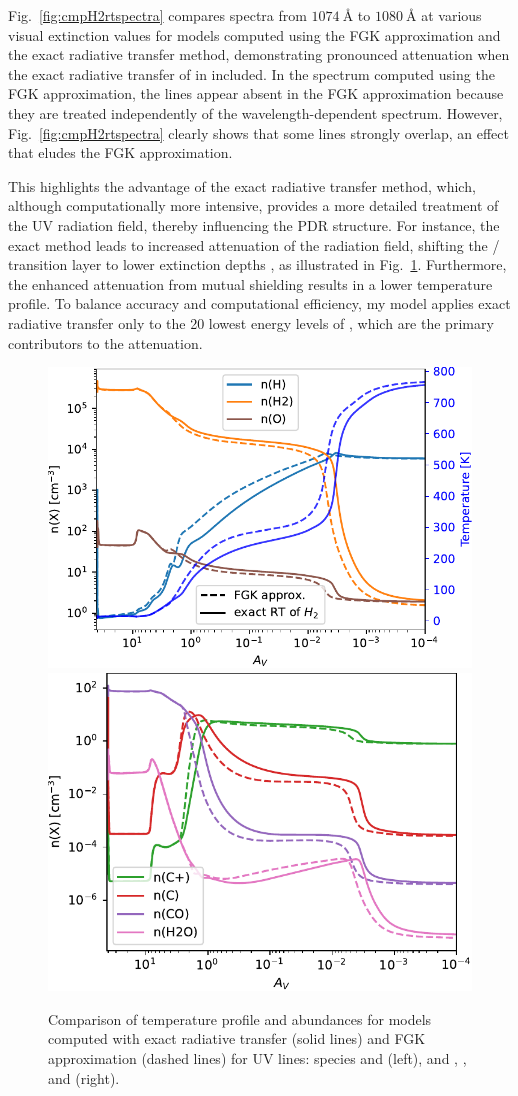 \documentclass[12pt,a4paper]{article}
\begin{document}
Fig.~\ref{fig:cmpH2rtspectra} compares spectra from $1074~\text{\AA}$ to $1080~\text{\AA}$ at various visual extinction values for models computed using the FGK approximation and the exact radiative transfer method, demonstrating pronounced attenuation when the exact radiative transfer of  in included. In the spectrum computed using the FGK approximation, the  lines appear absent in the FGK approximation because they are treated independently of the wavelength-dependent spectrum. However, Fig.~\ref{fig:cmpH2rtspectra} clearly shows that some  lines strongly overlap, an effect that eludes the FGK approximation.

This highlights the advantage of the exact radiative transfer method, which, although computationally more intensive, provides a more detailed treatment of the UV radiation field, thereby influencing the PDR structure. For instance, the exact method leads to increased attenuation of the radiation field, shifting the / transition layer to lower extinction depths \parencite{Goicoechea2007}, as illustrated in Fig.~\ref{fig:cmpH2rt}. Furthermore, the enhanced attenuation from mutual shielding results in a lower temperature profile. To balance accuracy and computational efficiency, my model applies exact radiative transfer only to the 20 lowest energy levels of , which are the primary contributors to the attenuation. 

\begin{figure}[ht]
    \centering
    \includegraphics[width=.51\textwidth,keepaspectratio]{cmpH2rt_H_O.pdf}
    \includegraphics[width=.48\textwidth,keepaspectratio]{cmpH2rt_CO_H2O.pdf}
    \caption{Comparison of temperature profile and abundances for models computed with exact radiative transfer (solid lines) and FGK approximation (dashed lines) for  UV lines:  species and  (left), and , , and  (right).} \label{fig:cmpH2rt}
\end{figure}
\end{document}
